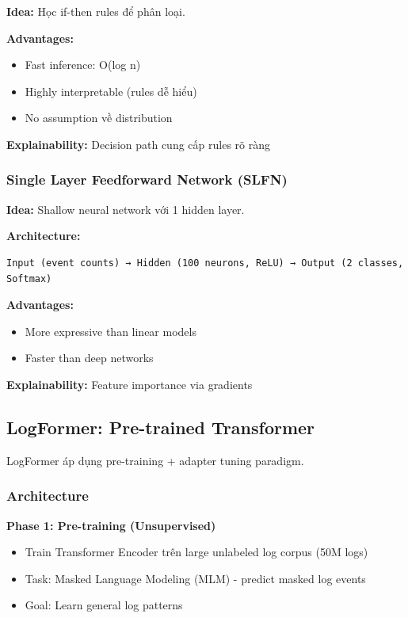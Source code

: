 \textbf{Idea:} Học if-then rules để phân loại.

\textbf{Advantages:}
\begin{itemize}
    \item Fast inference: O(log n)
    \item Highly interpretable (rules dễ hiểu)
    \item No assumption về distribution
\end{itemize}

\textbf{Explainability:} Decision path cung cấp rules rõ ràng

\subsubsection{Single Layer Feedforward Network (SLFN)}

\textbf{Idea:} Shallow neural network với 1 hidden layer.

\textbf{Architecture:}
\begin{verbatim}
Input (event counts) → Hidden (100 neurons, ReLU) → Output (2 classes, Softmax)
\end{verbatim}

\textbf{Advantages:}
\begin{itemize}
    \item More expressive than linear models
    \item Faster than deep networks
\end{itemize}

\textbf{Explainability:} Feature importance via gradients

\subsection{LogFormer: Pre-trained Transformer}

LogFormer \cite{guo2024logformer} áp dụng pre-training + adapter tuning paradigm.

\subsubsection{Architecture}

\textbf{Phase 1: Pre-training (Unsupervised)}
\begin{itemize}
    \item Train Transformer Encoder trên large unlabeled log corpus (50M logs)
    \item Task: Masked Language Modeling (MLM) - predict masked log events
    \item Goal: Learn general log patterns
\end{itemize}

